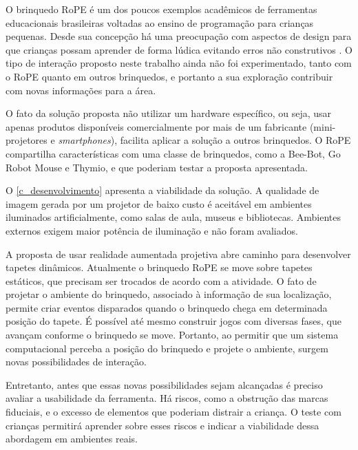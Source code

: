 
O brinquedo RoPE é um dos poucos exemplos acadêmicos de ferramentas educacionais brasileiras voltadas ao ensino de programação para crianças pequenas. Desde sua concepção há uma preocupação com aspectos de design para que crianças possam aprender de forma lúdica evitando erros não construtivos \cite{raabe_brinquedos_2015}. O tipo de interação proposto neste trabalho ainda não foi experimentado, tanto com o RoPE quanto em outros brinquedos, e portanto a sua exploração contribuir com novas informações para a área.

O fato da solução proposta não utilizar um hardware específico, ou seja, usar apenas produtos disponíveis comercialmente por mais de um fabricante (mini-projetores e \textit{smartphones}), facilita aplicar a solução a outros brinquedos. O RoPE compartilha características com uma classe de brinquedos, como a Bee-Bot, Go Robot Mouse e Thymio, e que poderiam testar a proposta apresentada.

O \autoref{c_desenvolvimento} apresenta a viabilidade da solução. A qualidade de imagem gerada por um projetor de baixo custo é aceitável em ambientes iluminados artificialmente, como salas de aula, museus e bibliotecas. Ambientes externos exigem maior potência de iluminação e não foram avaliados.

A proposta de usar realidade aumentada projetiva abre caminho para desenvolver tapetes dinâmicos. Atualmente o brinquedo RoPE se move sobre tapetes estáticos, que precisam ser trocados de acordo com a atividade. O fato de projetar o ambiente do brinquedo, associado à informação de sua localização, permite criar eventos disparados quando o brinquedo chega em determinada posição do tapete. É possível até mesmo construir jogos com diversas fases, que avançam conforme o brinquedo se move. Portanto, ao permitir que um sistema computacional perceba a posição do brinquedo e projete o ambiente, surgem novas possibilidades de interação.

Entretanto, antes que essas novas possibilidades sejam alcançadas é preciso avaliar a usabilidade da ferramenta. Há riscos, como a obstrução das marcas fiduciais, e o excesso de elementos que poderiam distrair a criança. O teste com crianças permitirá aprender sobre esses riscos e indicar a viabilidade dessa abordagem em ambientes reais.

